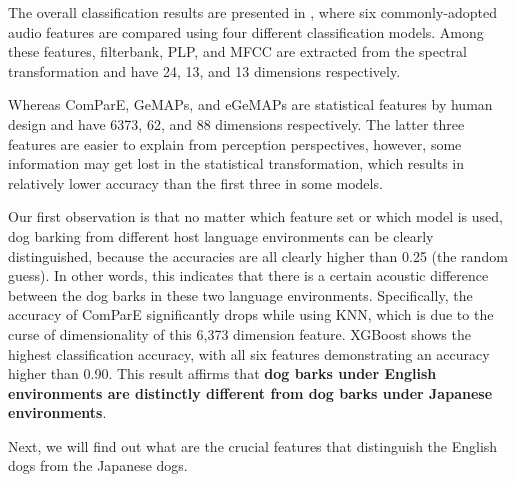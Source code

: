 The overall classification results are presented in , 
where six commonly-adopted audio features are compared using four different classification models. Among these features, filterbank, PLP, and MFCC 
are extracted from the spectral transformation and have 24, 13, and 13 dimensions respectively. 

Whereas ComParE, GeMAPs, and eGeMAPs are statistical features by human design and have 6373, 62, and 88 dimensions respectively. 
The latter three features are easier to explain from perception perspectives, 
however, some information may get lost in the statistical transformation, 
which results in relatively lower accuracy than the first three in some models. 


Our first observation is that no matter which feature set or which model is used, 
dog barking from different host language environments can be clearly distinguished, 
because the accuracies are all clearly higher than 0.25 (the random guess).
In other words, this indicates that there is a certain acoustic difference 
between the dog barks in these two language environments. 
Specifically, the accuracy of ComParE significantly drops while using KNN, 
which is due to the curse of dimensionality of this 6,373 dimension feature.
XGBoost shows the highest classification accuracy, 
with all six features demonstrating an accuracy higher than 0.90. This result affirms that
\textbf{dog barks under English environments are distinctly different from dog barks 
	under Japanese environments}.

Next, we will find out what are the crucial features 
that distinguish the English dogs from the Japanese dogs. 


